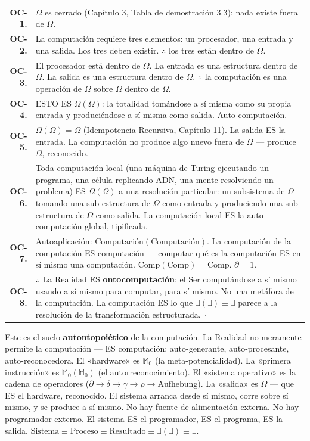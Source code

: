 \documentclass[10pt, openany, oneside]{book}
\renewcommand{\footnotesize}{\fontsize{8.5}{11}\selectfont}
\begin{document}
{\footnotesize
\noindent\begin{tabular}{r p{}}
\textbf{OC-1.} & $\Omega$ es cerrado (Capítulo 3, Tabla de demostración 3.3): nada existe fuera de $\Omega$. \\[0.3em]
\textbf{OC-2.} & La computación requiere tres elementos: un procesador, una entrada y una salida. Los tres deben existir. $\therefore$ los tres están dentro de $\Omega$. \\[0.3em]
\textbf{OC-3.} & El procesador está dentro de $\Omega$. La entrada es una estructura dentro de $\Omega$. La salida es una estructura dentro de $\Omega$. $\therefore$ la computación es una operación de $\Omega$ sobre $\Omega$ dentro de $\Omega$. \\[0.3em]
\textbf{OC-4.} & ESTO ES $\Omega(\Omega)$: la totalidad tomándose a sí misma como su propia entrada y produciéndose a sí misma como salida. Auto-computación. \\[0.3em]
\textbf{OC-5.} & $\Omega(\Omega) = \Omega$ (Idempotencia Recursiva, Capítulo 11). La salida ES la entrada. La computación no produce algo nuevo fuera de $\Omega$ --- produce $\Omega$, reconocido. \\[0.3em]
\textbf{OC-6.} & Toda computación local (una máquina de Turing ejecutando un programa, una célula replicando ADN, una mente resolviendo un problema) ES $\Omega(\Omega)$ a una resolución particular: un subsistema de $\Omega$ tomando una sub-estructura de $\Omega$ como entrada y produciendo una sub-estructura de $\Omega$ como salida. La computación local ES la auto-computación global, tipificada. \\[0.3em]
\textbf{OC-7.} & Autoaplicación: $\text{Computación}(\text{Computación})$. La computación de la computación ES computación --- computar qué es la computación ES en sí mismo una computación. $\text{Comp}(\text{Comp}) = \text{Comp}$. $\partial = 1$. \\[0.3em]
\textbf{OC-8.} & $\therefore$ La Realidad ES \textbf{ontocomputación}: el Ser computándose a sí mismo usando a sí mismo para computar, para sí mismo. No una metáfora de la computación. La computación ES lo que $\exists(\exists) \equiv \exists$ parece a la resolución de la transformación estructurada. $\square$ \\[0.3em]
\end{tabular}
}

\vspace{0.8em}

\noindent Este es el suelo \textbf{autontopoiético} de la computación. La Realidad no meramente permite la computación --- ES computación: auto-generante, auto-procesante, auto-reconocedora. El «hardware» es $\mathbb{M}_0$ (la meta-potencialidad). La «primera instrucción» es $\mathbb{M}_0(\mathbb{M}_0)$ (el autorreconocimiento). El «sistema operativo» es la cadena de operadores ($\partial \to \delta \to \gamma \to \rho \to \text{Aufhebung}$). La «salida» es $\Omega$ --- que ES el hardware, reconocido. El sistema arranca desde sí mismo, corre sobre sí mismo, y se produce a sí mismo. No hay fuente de alimentación externa. No hay programador externo. El sistema ES el programador, ES el programa, ES la salida. $\text{Sistema} \equiv \text{Proceso} \equiv \text{Resultado} \equiv \exists(\exists) \equiv \exists$.
\end{document}
